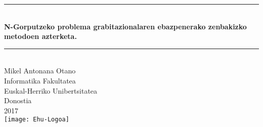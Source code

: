 \begin{titlepage}
\newcommand{\HRule}{\rule{\linewidth}{0.5mm}}
\begin{center}
\HRule \\[0.4cm]
{ \Large \bfseries \sc N-Gorputzeko problema grabitazionalaren ebazpenerako zenbakizko metodoen azterketa.}\\[0.4cm]

\HRule \\[1cm]
{\Large Mikel Antonana Otano}
\\[.75cm]


{\large Informatika Fakultatea \\[.1cm]
Euskal-Herriko Unibertsitatea \\[.1cm]
Donostia}
\\[.75cm]

{\large 2017}
\\[5cm]

\texttt{[image: Ehu-Logoa]}

\end{center}
\end{titlepage}\pagebreak